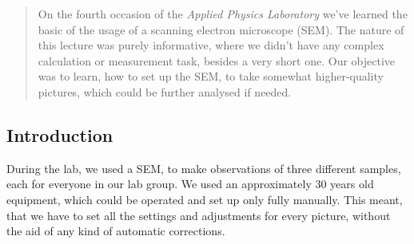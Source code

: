 \begin{abstract}
    \noindent On the fourth occasion of the \emph{Applied Physics Laboratory} we've learned the basic of the usage of a scanning electron microscope (SEM). The nature of this lecture was purely informative, where we didn't have any complex calculation or measurement task, besides a very short one. Our objective was to learn, how to set up the SEM, to take somewhat higher-quality pictures, which could be further analysed if needed.
\end{abstract}

\begin{multicols}{2}
\section{Introduction}
During the lab, we used a SEM, to make observations of three different samples, each for everyone in our lab group. We used an approximately 30 years old equipment, which could be operated and set up only fully manually. This meant, that we have to set all the settings and adjustments for every picture, without the aid of any kind of automatic corrections.



\end{multicols}
